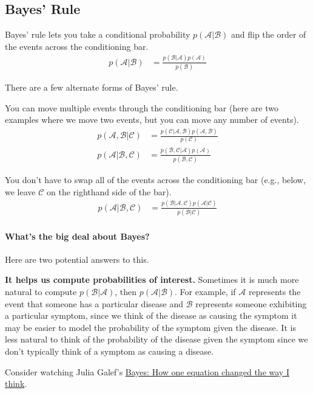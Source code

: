 \documentclass[review_Solutions]{subfiles}
\begin{document}
\subsection{Bayes' Rule}

Bayes' rule lets you take a conditional probability $p(\mathcal{A}|\mathcal{B})$ and flip the order of the events across the conditioning bar.
\begin{align}
p(\mathcal{A}|\mathcal{B}) &= \frac{p(\mathcal{B}|\mathcal{A}) p(\mathcal{A})}{p(\mathcal{B})}
\end{align}

There are a few alternate forms of Bayes' rule.
\bi
\item You can move multiple events through the conditioning bar (here are two examples where we move two events, but you can move any number of events).
\begin{align}
p(\mathcal{A}, \mathcal{B} | \mathcal{C}) &= \frac{p(\mathcal{C}|\mathcal{A}, \mathcal{B}) p(\mathcal{A}, \mathcal{B})}{p(\mathcal{C})} \\
p(\mathcal{A} |  \mathcal{B}, \mathcal{C}) &= \frac{p(\mathcal{B}, \mathcal{C}|\mathcal{A}) p(\mathcal{A})}{p(\mathcal{B}, \mathcal{C})}
\end{align}
\item You don't have to swap all of the events across the conditioning bar (e.g., below, we leave $\mathcal{C}$ on the righthand side of the bar).
\begin{align}
p(\mathcal{A}|\mathcal{B},\mathcal{C}) &= \frac{p(\mathcal{B} | \mathcal{A}, \mathcal{C}) p(\mathcal{A}|\mathcal{C})}{p(\mathcal{B}|\mathcal{C})}
\end{align}
\ei


\paragraph{What's the big deal about Bayes?}
Here are two potential answers to this.
\bi
\item \textbf{It helps us compute probabilities of interest.}  Sometimes it is much more natural to compute $p(\mathcal{B} | \mathcal{A})$, then $p(\mathcal{A} | \mathcal{B})$.  For example, if $\mathcal{A}$ represents the event that someone has a particular disease and $\mathcal{B}$ represents someone exhibiting a particular symptom, since we think of the disease as causing the symptom it may be easier to model the probability of the symptom given the disease.  It is less natural to think of the probability of the disease given the symptom since we don't typically think of a symptom as causing a disease.
\item Consider watching Julia Galef's \href{https://www.youtube.com/watch?v=za7RqnT7CM0}{Bayes: How one equation changed the way I think}.
\ei
\end{document}
